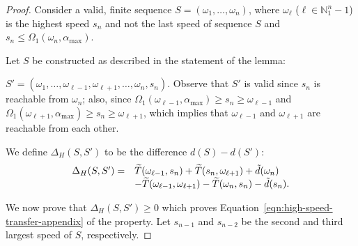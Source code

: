 \begin{proof}
Consider a valid, finite sequence $S = (\omega_1, \ldots, \omega_n)$, where $\omega_\ell$ ($\ell \in \mathbb{N}_1^n-1$) is the highest speed $s_n$ and not the last speed of sequence $S$ and $s_n \leq \Omega_1(\omega_n,\alpha_{\max})$.

Let $S$ be constructed as described in the statement of the lemma:

\noindent $S' = (\omega_1, \ldots, \omega_{\ell-1}, \omega_{\ell+1}, \ldots, \omega_n, s_n)$.  Observe that $S'$ is valid since $s_n$ is reachable from $\omega_n$; also, since $\Omega_1(\omega_{\ell-1},\alpha_{\max}) \geq s_n \geq \omega_{\ell-1}$ and $\Omega_1(\omega_{\ell+1},\alpha_{\max}) \geq s_n \geq \omega_{\ell+1}$, which implies that $\omega_{\ell-1}$ and $\omega_{\ell+1}$ are reachable from each other.  

We define $\Delta_H(S,S')$ to be the difference $d(S) - d(S')$:
\begin{equation}\label{eq:tHST}
\begin{array}{ll}
    \Delta_H(S,S') =& \widetilde{T}(\omega_{\ell-1}, s_n) + \widetilde{T}(s_n, \omega_{\ell+1})+  \Tilde{d}(\omega_n)\\
     &- \widetilde{T}(\omega_{\ell-1},\omega_{\ell+1}) - \widetilde{T}(\omega_n, s_n)
        - \Tilde{d}(s_n). 
\end{array}
\end{equation}

We now prove that $\Delta_H(S,S') \geq 0$ which proves Equation~\ref{eqn:high-speed-transfer-appendix} of the property.  Let $s_{n-1}$ and $s_{n-2}$ be the second and third largest speed of $S$, respectively.


\end{proof}

